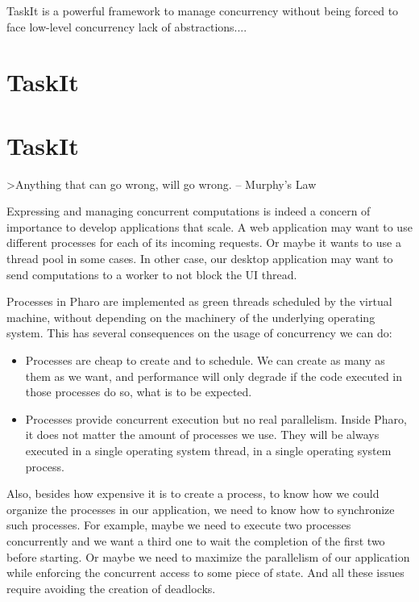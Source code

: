 \documentclass[10pt,twoside,english]{_support/latex/sbabook/sbabook}
\begin{document}
\frontmatter
\pagestyle{plain}

\tableofcontents*
\clearpage\listoffigures

\mainmatter


TaskIt is a powerful framework to manage concurrency without being forced to face low-level concurrency
lack of abstractions....
\part{TaskIt}\part{TaskIt}
\textgreater{}Anything that can go wrong, will go wrong. -- Murphy's Law

Expressing and managing concurrent computations is indeed a concern of importance to develop applications that scale. A web application may want to use different processes for each of its incoming requests. Or maybe it wants to use a thread pool in some cases. In other case, our desktop application may want to send computations to a worker to not block the UI thread. 

Processes in Pharo are implemented as green threads scheduled by the virtual machine, without depending on the machinery of the underlying operating system. This has several consequences on the usage of concurrency we can do:

\begin{itemize}
\item Processes are cheap to create and to schedule. We can create as many as them as we want, and performance will only degrade if the code executed in those processes do so, what is to be expected.
\item Processes provide concurrent execution but no real parallelism. Inside Pharo, it does not matter the amount of processes we use. They will be always executed in a single operating system thread, in a single operating system process.
\end{itemize}

Also, besides how expensive it is to create a process, to know how we could organize the processes in our application, we need to know how to synchronize such processes. For example, maybe we need to execute two processes concurrently and we want a third one to wait the completion of the first two before starting. Or maybe we need to maximize the parallelism of our application while enforcing the concurrent access to some piece of state. And all these issues require avoiding the creation of deadlocks.
\end{document}

